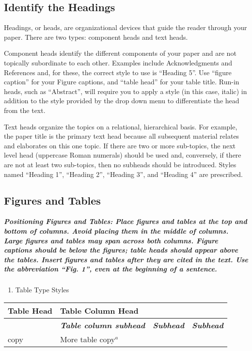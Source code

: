 \documentclass{article} %
\begin{document}
\noindent 


\subsection{ Identify the Headings}

Headings, or heads, are organizational devices that guide the reader through your paper. There are two types: component heads and text heads.

Component heads identify the different components of your paper and are not topically subordinate to each other. Examples include Acknowledgments and References and, for these, the correct style to use is ``Heading 5''. Use ``figure caption'' for your Figure captions, and ``table head'' for your table title. Run-in heads, such as ``Abstract'', will require you to apply a style (in this case, italic) in addition to the style provided by the drop down menu to differentiate the head from the text.

Text heads organize the topics on a relational, hierarchical basis. For example, the paper title is the primary text head because all subsequent material relates and elaborates on this one topic. If there are two or more sub-topics, the next level head (uppercase Roman numerals) should be used and, conversely, if there are not at least two sub-topics, then no subheads should be introduced. Styles named ``Heading 1'', ``Heading 2'', ``Heading 3'', and ``Heading 4'' are prescribed.


\subsection{ Figures and Tables}


\subparagraph{  Positioning Figures and Tables: Place figures and tables at the top and bottom of columns. Avoid placing them in the middle of columns. Large figures and tables may span across both columns. Figure captions should be below the figures; table heads should appear above the tables. Insert figures and tables after they are cited in the text. Use the abbreviation ``Fig. 1'', even at the beginning of a sentence.}

\begin{enumerate}
\item \textit{ }Table Type Styles
\end{enumerate}

\begin{tabular}{|p{0.3in}|p{1.1in}|p{0.4in}|p{0.4in}|} \hline 
\textbf{Table Head} & \multicolumn{3}{|p{1.9in}|}{\textbf{Table Column Head}} \\ \hline 
\textbf{} & \textbf{\textit{Table column subhead}} & \textbf{\textit{Subhead}} & \textbf{\textit{Subhead}} \\ \hline 
copy & More table copy${}^{a}$ &  &  \\ \hline 
\end{tabular}
\end{document}
